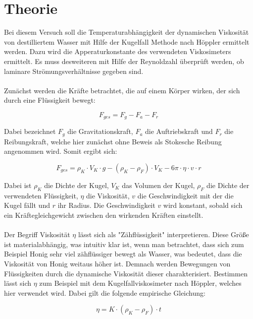 \section{Theorie}
\label{sec:Theorie}

Bei diesem Versuch soll die Temperaturabhängigkeit der dynamischen 
Viskosität von destilliertem Wasser mit Hilfe der Kugelfall Methode nach 
Höppler ermittelt werden. Dazu wird die Apperaturkonstante des 
verwendeten Viskosimeters ermittelt. Es muss desweiteren mit Hilfe der 
Reynoldzahl überprüft werden, ob laminare Strömungsverhältnisse gegeben 
sind. \\
\\Zunächst werden die Kräfte betrachtet, die auf einem Körper wirken, der
sich durch eine Flüssigkeit bewegt: 

\begin{equation}
F_{ges} = F_g - F_a - F_r
\end{equation}

Dabei bezeichnet $F_g$ die Gravitationskraft, $F_a$ die Auftriebskraft und 
$F_r$ die Reibungskraft, welche hier zunächst ohne Beweis als Stokesche 
Reibung angenommen wird. Somit ergibt sich: 

\begin{equation}
F_{ges} = \rho _K\cdot V_K\cdot g - (\rho _K - \rho _F)\cdot V_K - 6\pi\cdot \eta \cdot v\cdot r
\end{equation}

Dabei ist $\rho _K$ die Dichte der Kugel, $V_K$ das Volumen der Kugel, 
$\rho _F$ die Dichte der verwendeten Flüssigkeit, $\eta$ die Viskosität, 
$v$ die Geschwindigkeit mit der die Kugel fällt und $r$ ihr Radius. 
Die Geschwindigkeit $v$ wird konstant, sobald sich ein Kräftegleichgewicht 
zwischen den wirkenden Kräften einstellt. \\
\\Der Begriff Viskosität $\eta$ lässt sich als "Zähflüssigkeit" interpretieren.
Diese Größe ist materialabhängig, was intuitiv klar ist, wenn man betrachtet, 
dass sich zum Beispiel Honig sehr viel zähflüssiger bewegt als Wasser, was bedeutet, 
dass die Viskosität von Honig weitaus höher ist. 
Demnach werden Bewegungen von Flüssigkeiten durch die dynamische Viskosität dieser 
charakterisiert. 
Bestimmen lässt sich $\eta$ zum Beispiel mit dem Kugelfallviskosimeter nach 
Höppler, welches hier verwendet wird. Dabei gilt die folgende empirische Gleichung: 

\begin{equation}
\eta = K\cdot (\rho _K - \rho _F)\cdot t
\label{eqn:Viskosität}
\end{equation}

